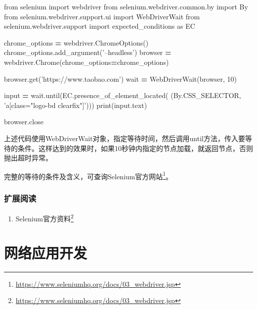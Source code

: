 \documentclass[]{ctexbook}
\newenvironment{Shaded}{\begin{snugshade}}{\end{snugshade}}
\newcommand{\BuiltInTok}[1]{#1}
\newcommand{\DecValTok}[1]{\textcolor[rgb]{0.00,0.00,0.81}{#1}}
\newcommand{\ImportTok}[1]{#1}
\newcommand{\NormalTok}[1]{#1}
\newcommand{\OperatorTok}[1]{\textcolor[rgb]{0.81,0.36,0.00}{\textbf{#1}}}
\newcommand{\StringTok}[1]{\textcolor[rgb]{0.31,0.60,0.02}{#1}}
\providecommand{\tightlist}{%
  \setlength{\itemsep}{0pt}\setlength{\parskip}{0pt}}
\renewcommand{\href}[2]{#2\footnote{\url{#1}}}
\begin{document}
\begin{Shaded}
\begin{Highlighting}[]
\ImportTok{from}\NormalTok{ selenium }\ImportTok{import}\NormalTok{ webdriver}
\ImportTok{from}\NormalTok{ selenium.webdriver.common.by }\ImportTok{import}\NormalTok{ By}
\ImportTok{from}\NormalTok{ selenium.webdriver.support.ui }\ImportTok{import}\NormalTok{ WebDriverWait}
\ImportTok{from}\NormalTok{ selenium.webdriver.support }\ImportTok{import}\NormalTok{ expected_conditions }\ImportTok{as}\NormalTok{ EC}

\NormalTok{chrome_options }\OperatorTok{=}\NormalTok{ webdriver.ChromeOptions()}
\NormalTok{chrome_options.add_argument(}\StringTok{'--headless'}\NormalTok{)}
\NormalTok{browser }\OperatorTok{=}\NormalTok{ webdriver.Chrome(chrome_options}\OperatorTok{=}\NormalTok{chrome_options)}

\NormalTok{browser.get(}\StringTok{'https://www.taobao.com'}\NormalTok{)}
\NormalTok{wait }\OperatorTok{=}\NormalTok{ WebDriverWait(browser, }\DecValTok{10}\NormalTok{)}

\BuiltInTok{input} \OperatorTok{=}\NormalTok{ wait.until(EC.presence_of_element_located(}
\NormalTok{    (By.CSS_SELECTOR, }\StringTok{'a[class="logo-bd clearfix"]'}\NormalTok{)))}
\BuiltInTok{print}\NormalTok{(}\BuiltInTok{input}\NormalTok{.text)}

\NormalTok{browser.close}
\end{Highlighting}
\end{Shaded}

上述代码使用WebDriverWait对象，指定等待时间，然后调用until方法，传入要等待的条件。这样达到的效果时，如果10秒钟内指定的节点加载，就返回节点，否则抛出超时异常。

完整的等待的条件及含义，可查询\href{https://www.seleniumhq.org/docs/03_webdriver.jsp}{Selenium官方网站}。

\hypertarget{ux6269ux5c55ux9605ux8bfb}{%
\section{扩展阅读}\label{ux6269ux5c55ux9605ux8bfb}}

\begin{enumerate}
\def\labelenumi{\arabic{enumi}.}
\tightlist
\item
  \href{https://www.seleniumhq.org/docs/03_webdriver.jsp}{Selenium官方资料}
\end{enumerate}

\hypertarget{part-ux7f51ux7edcux5e94ux7528ux5f00ux53d1}{%
\part{网络应用开发}\label{part-ux7f51ux7edcux5e94ux7528ux5f00ux53d1}}
\end{document}
